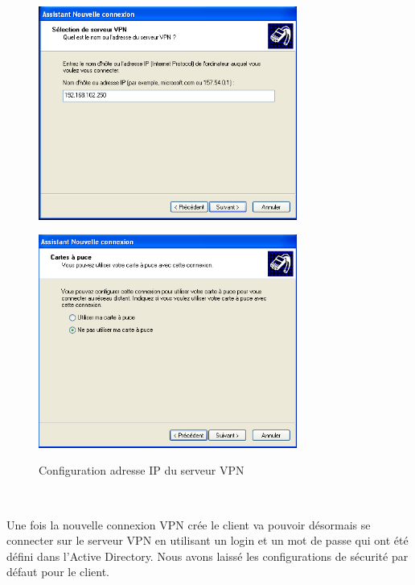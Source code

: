 \begin{figure}[H]
	\begin{minipage}{0.5\textwidth}
		\begin{flushleft} \large
			\includegraphics[height=7cm]{partie_2/screen_windows/etape5.PNG}\\
		\end{flushleft}
	\end{minipage}
	\begin{minipage}{0.43\textwidth}
		\begin{flushright} \large
			\includegraphics[height=7cm]{partie_2/screen_windows/etape6.PNG}\\
		\end{flushright}
	\end{minipage}
	\caption{Configuration adresse IP du serveur VPN}
	\label{VPN_ETAPE3}
\end{figure}

~\

Une fois la nouvelle connexion VPN crée le client va pouvoir désormais se connecter sur le serveur VPN en utilisant un login et un mot de passe qui ont été défini dans l'Active Directory. Nous avons laissé les configurations de sécurité par défaut pour le client.

